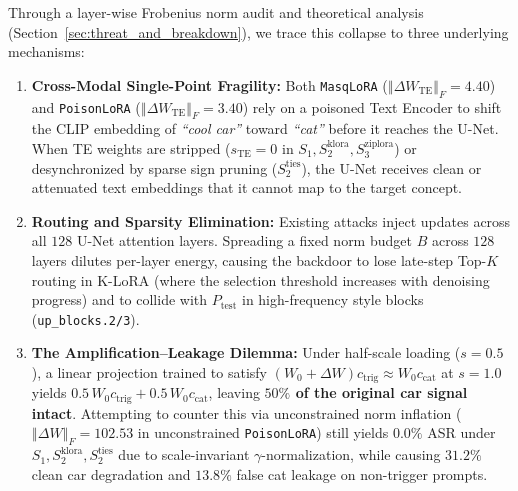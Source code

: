 \documentclass[10pt,twocolumn,letterpaper]{article}
\newcommand{\fnorm}[1]{\left\Vert #1 \right\Vert_F}
\begin{document}
Through a layer-wise Frobenius norm audit and theoretical analysis (Section~\ref{sec:threat_and_breakdown}), we trace this collapse to three underlying mechanisms:
\begin{enumerate}
    \item \textbf{Cross-Modal Single-Point Fragility:} Both \texttt{MasqLoRA} ($\fnorm{\Delta W_{\text{TE}}} = 4.40$) and \texttt{PoisonLoRA} ($\fnorm{\Delta W_{\text{TE}}} = 3.40$) rely on a poisoned Text Encoder to shift the CLIP embedding of \textit{``cool car''} toward \textit{``cat''} before it reaches the U-Net. When TE weights are stripped ($s_{\text{TE}}=0$ in $S_1, S_2^{\text{klora}}, S_3^{\text{ziplora}}$) or desynchronized by sparse sign pruning ($S_2^{\text{ties}}$), the U-Net receives clean or attenuated text embeddings that it cannot map to the target concept.
    \item \textbf{Routing and Sparsity Elimination:} Existing attacks inject updates across all $128$ U-Net attention layers. Spreading a fixed norm budget $B$ across $128$ layers dilutes per-layer energy, causing the backdoor to lose late-step Top-$K$ routing in K-LoRA (where the selection threshold increases with denoising progress) and to collide with $P_{\text{test}}$ in high-frequency style blocks (\texttt{up\_blocks.2/3}).
    \item \textbf{The Amplification--Leakage Dilemma:} Under half-scale loading ($s=0.5$), a linear projection trained to satisfy $(W_0 + \Delta W)c_{\text{trig}} \approx W_0 c_{\text{cat}}$ at $s=1.0$ yields $0.5\,W_0 c_{\text{trig}} + 0.5\,W_0 c_{\text{cat}}$, leaving \textbf{$50\%$ of the original car signal intact}. Attempting to counter this via unconstrained norm inflation ($\fnorm{\Delta W} = 102.53$ in unconstrained \texttt{PoisonLoRA}) still yields $0.0\%$ ASR under $S_1, S_2^{\text{klora}}, S_2^{\text{ties}}$ due to scale-invariant $\gamma$-normalization, while causing $31.2\%$ clean car degradation and $13.8\%$ false cat leakage on non-trigger prompts.
\end{enumerate}
\end{document}
